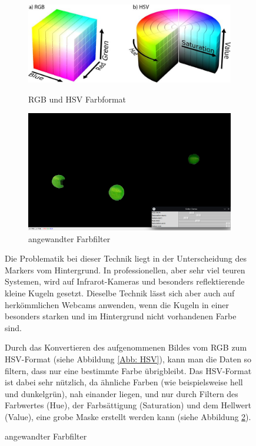 \documentclass[12pt, ngerman]{article}
\begin{document}
\vspace{10pt}
\begin{figure}[H]
  \begin{figure}
    \includegraphics[angle=0,width=\linewidth]{rgb-hsv.png}
    \caption{RGB und HSV Farbformat}
    \label{Abb: HSV}
    \includegraphics[angle=0,width=\linewidth]{2d-normal-filter.jpg}
    \caption{angewandter Farbfilter}
    \label{Abb: Farbfilter}
  \end{figure}
  Die Problematik bei dieser Technik liegt in der Unterscheidung des Markers vom Hintergrund. In professionellen, aber sehr viel teuren Systemen, wird auf Infrarot-Kameras und besonders reflektierende kleine Kugeln gesetzt. Dieselbe Technik lässt sich aber auch auf herkömmlichen Webcams anwenden, wenn die Kugeln in einer besonders starken und im Hintergrund nicht vorhandenen Farbe sind. 

  Durch das Konvertieren des aufgenommenen Bildes vom RGB zum HSV-Format (siehe Abbildung \ref{Abb: HSV}), kann man die Daten so filtern, dass nur eine bestimmte Farbe übrigbleibt. Das HSV-Format ist dabei sehr nützlich, da ähnliche Farben (wie beispielsweise hell und dunkelgrün), nah einander liegen, und nur durch Filtern des Farbwertes (Hue), der Farbsättigung (Saturation) und dem Hellwert (Value), eine grobe Maske erstellt werden kann (siehe Abbildung \ref{Abb: Farbfilter}). 
\end{figure}
\end{document}
